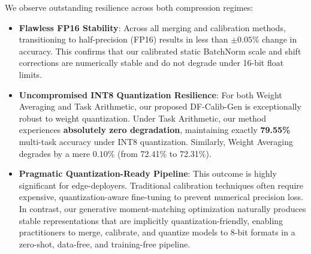 \documentclass{article}
\theoremstyle{plain}
\theoremstyle{definition}
\theoremstyle{remark}
\begin{document}
\begin{table}[h]
\caption{Impact of half-precision (FP16) and 8-bit weight-only quantization (INT8) on multi-task average classification accuracy (\%).}
\label{tab:quantization}
\vskip 0.15in
\begin{center}
\begin{small}
\end{small}
\end{center}
\vskip -0.1in
\end{table}

We observe outstanding resilience across both compression regimes:
\begin{itemize}
  \item \textbf{Flawless FP16 Stability}: Across all merging and calibration methods, transitioning to half-precision (FP16) results in less than $\pm0.05\%$ change in accuracy. This confirms that our calibrated static BatchNorm scale and shift corrections are numerically stable and do not degrade under 16-bit float limits.
  \item \textbf{Uncompromised INT8 Quantization Resilience}: For both Weight Averaging and Task Arithmetic, our proposed DF-Calib-Gen is exceptionally robust to weight quantization. Under Task Arithmetic, our method experiences \textbf{absolutely zero degradation}, maintaining exactly \textbf{79.55\%} multi-task accuracy under INT8 quantization. Similarly, Weight Averaging degrades by a mere $0.10\%$ (from 72.41\% to 72.31\%).
  \item \textbf{Pragmatic Quantization-Ready Pipeline}: This outcome is highly significant for edge-deployers. Traditional calibration techniques often require expensive, quantization-aware fine-tuning to prevent numerical precision loss. In contrast, our generative moment-matching optimization naturally produces stable representations that are implicitly quantization-friendly, enabling practitioners to merge, calibrate, and quantize models to 8-bit formats in a zero-shot, data-free, and training-free pipeline.
\end{itemize}
\end{document}
